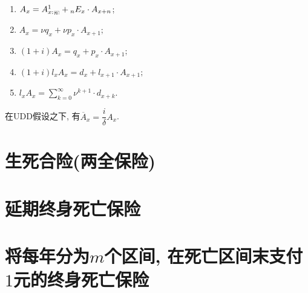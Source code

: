 \documentclass[lang=cn,10pt]{elegantbook}
\makeatletter
\DeclareRobustCommand{\annu}[1]{_{%
    \def\arraystretch{0}%
    \setlength\arraycolsep{1pt}%
    \setlength\arrayrulewidth{.2pt}%
    \begin{array}[b]{@{}c|}\hline
        \\[\arraycolsep]%
        \scriptstyle #1%
    \end{array}%
}}
\makeatother
\begin{document}
\begin{corollary}[精算现值的性质]
	\begin{enumerate}
		\item ${A}_x = {A}_{x:}^1{}_{\annu{n}} + {}_nE_{x}\cdot {A}_{x+n}$;
		\item ${A}_x = \nu q_x + \nu p_x\cdot {A}_{x+1};$
		\item $(1+i){A}_x = q_x + p_x\cdot {A}_{x+1};$
		\item $(1+i)l_x{A}_x = d_x + l_{x+1}\cdot {A}_{x+1};$
		\item $l_x{A}_x = \sum_{k=0}^{\infty }{\nu^{k+1}\cdot d_{x+k}}.$
	\end{enumerate}
\end{corollary}

\begin{proposition}
	在UDD假设之下, 有$\overline A_x=\dfrac{i}{\delta}A_x$.
  \end{proposition}

\section{生死合险(两全保险)}

\section{延期终身死亡保险}

















\section{将每年分为$m$个区间, 在死亡区间末支付$1$元的终身死亡保险}
\end{document}
